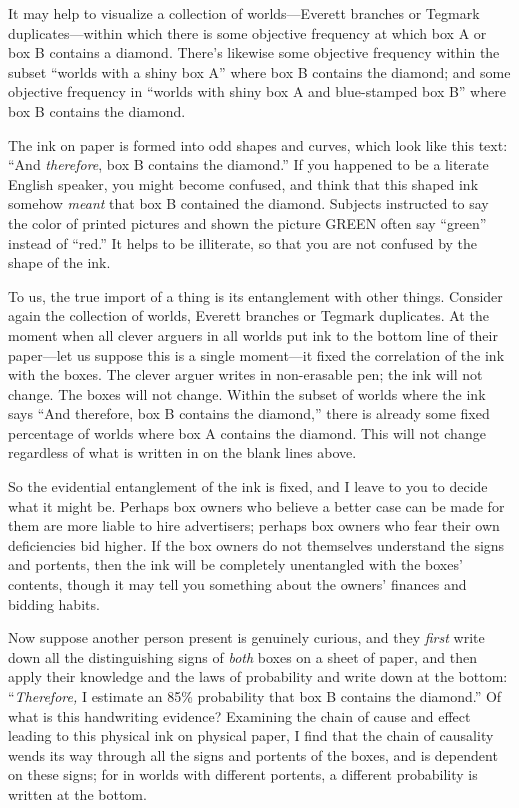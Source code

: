 {
 It may help to visualize a collection of worlds---Everett branches
or Tegmark duplicates{}---within which there is some objective
frequency at which box A or box B contains a diamond.
There's likewise some objective frequency within the
subset ``worlds with a shiny box A''
where box B contains the diamond; and some objective frequency in
``worlds with shiny box A and blue-stamped box
B'' where box B contains the diamond.}

{
 The ink on paper is formed into odd shapes and curves, which look
like this text: ``And \textit{therefore}, box B
contains the diamond.'' If you happened to be a
literate English speaker, you might become confused, and think that
this shaped ink somehow \textit{meant} that box B contained the
diamond. Subjects instructed to say the color of printed pictures and
shown the picture GREEN often say
``green'' instead of
``red.'' It helps to be illiterate,
so that you are not confused by the shape of the ink.}

{
 To us, the true import of a thing is its entanglement with other
things. Consider again the collection of worlds, Everett branches or
Tegmark duplicates. At the moment when all clever arguers in all worlds
put ink to the bottom line of their paper---let us suppose this is a
single moment---it fixed the correlation of the ink with the boxes. The
clever arguer writes in non-erasable pen; the ink will not change. The
boxes will not change. Within the subset of worlds where the ink says
``And therefore, box B contains the
diamond,'' there is already some fixed percentage of
worlds where box A contains the diamond. This will not change
regardless of what is written in on the blank lines above.}

{
 So the evidential entanglement of the ink is fixed, and I leave to
you to decide what it might be. Perhaps box owners who believe a better
case can be made for them are more liable to hire advertisers; perhaps
box owners who fear their own deficiencies bid higher. If the box
owners do not themselves understand the signs and portents, then the
ink will be completely unentangled with the boxes'
contents, though it may tell you something about the
owners' finances and bidding habits.}

{
 Now suppose another person present is genuinely curious, and they
\textit{first} write down all the distinguishing signs of \textit{both}
boxes on a sheet of paper, and then apply their knowledge and the laws
of probability and write down at the bottom:
``\textit{Therefore,} I estimate an 85\% probability
that box B contains the diamond.'' Of what is this
handwriting evidence? Examining the chain of cause and effect leading
to this physical ink on physical paper, I find that the chain of
causality wends its way through all the signs and portents of the
boxes, and is dependent on these signs; for in worlds with different
portents, a different probability is written at the bottom.}

